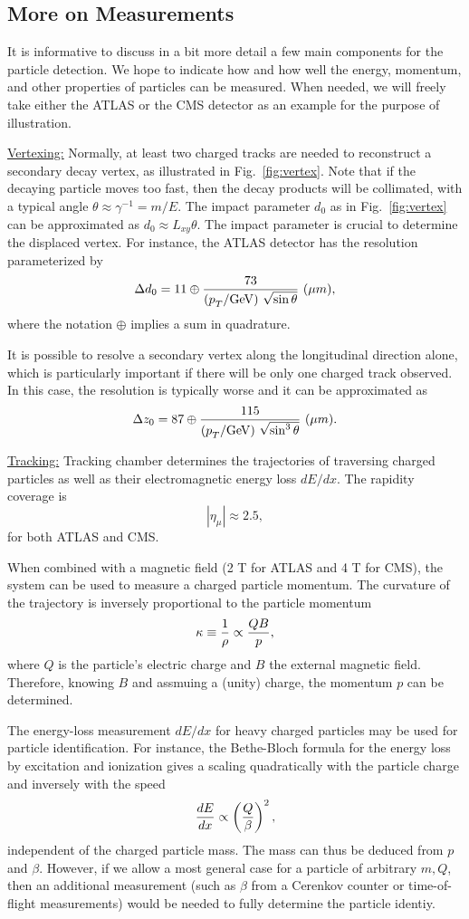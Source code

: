 \documentclass[prd,aps,floats,preprintnumbers,preprint,superscriptaddress,floatfix,nofootinbib]{revtex4}
\def\pt{p_T^{}}
\def\gev{{\rm GeV}}
\def\be{\begin{equation}}
\def\ee{\end{equation}}
\begin{document}
\subsection{More on Measurements}

It is  informative to discuss in a bit more detail a few main
components for the particle detection. We hope to indicate how and 
how well the energy, momentum, and other properties of particles
can be measured. When needed, we will freely take either the ATLAS 
or the CMS detector as an example  for the purpose of illustration.

\vskip 0.3cm
\noindent
\underline{Vertexing:} 
Normally, at least two charged tracks are needed 
to reconstruct a secondary decay vertex, as illustrated in Fig.~\ref{fig:vertex}.
Note that if the decaying particle moves too fast, then the decay products
will be collimated, with a typical angle $\theta \approx \gamma^{-1} =m/E$.
The impact parameter $d_0$ as in Fig.~\ref{fig:vertex} can be approximated
as $d_0\approx L_{xy} \theta$. 
The impact parameter is crucial to determine the displaced vertex.
For instance, the ATLAS detector \cite{ATLAS} has the resolution 
parameterized by 
\be
{\Delta d_0} = 11 \oplus {73\over (\pt/\gev)\ \sqrt{\sin\theta}}\ (\mu m),
\ee
where the notation $\oplus$ implies a sum in quadrature. 

It is possible to resolve a secondary vertex  along the longitudinal direction
alone, which is particularly important if there will be only one charged
track  observed. In this case, the resolution is typically worse and it can
be approximated \cite{ATLAS} as
\be
{\Delta z_0} = 87 \oplus {115 \over (\pt/\gev)\  \sqrt{\sin^3\theta}}\ (\mu m).
\ee

\vskip 0.3cm
\noindent
\underline{Tracking:} Tracking chamber determines the trajectories
of traversing charged particles as well as their electromagnetic energy
loss $dE/dx$. The rapidity coverage is 
\be
|\eta_\mu|\approx 2.5,
\ee
for both ATLAS and CMS.
 
When combined with a magnetic field (2 T for ATLAS and 4 T for CMS), 
the system can be used to measure a charged particle momentum.
The curvature of the trajectory is inversely proportional to the particle
momentum
\be
\kappa \equiv {1\over \rho} \propto {QB \over p},
\label{curv}
\ee
where $Q$ is the particle's electric charge and $B$ the external magnetic
field. Therefore, knowing $B$ and assmuing a (unity) charge, the momentum
$p$ can be determined. 

The energy-loss measurement $dE/dx$ for heavy charged particles 
may be used for particle identification. 
For instance, the Bethe-Bloch formula for the
energy loss by excitation and ionization gives a  scaling quadratically 
with the particle charge and inversely with the speed
\be
{dE\over dx} \propto \left({Q \over \beta} \right)^2,
\ee
independent of the charged particle mass. 
The mass can thus be deduced from $p$ and $\beta$. However, if we allow
a most general case for a particle of arbitrary $m,Q$, then an additional 
measurement (such as $\beta$ from a Cerenkov counter or time-of-flight
measurements) would be needed to fully determine the particle identiy.
\end{document}
